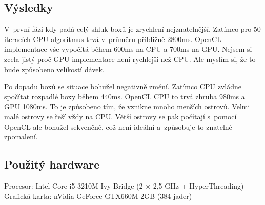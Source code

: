 \documentclass[11pt,a4paper]{article}
\begin{document}
\subsection{Výsledky}

V~první fázi kdy padá celý shluk boxů je zrychlení nejznatelnější.
Zatímco pro 50 iteracích CPU algoritmus trvá v~průměru přibližně 2800ms.
OpenCL implementace vše vypočítá během 600ms na CPU a 700ms na GPU.
Nejsem si zcela jistý proč GPU implementace není rychlejší než CPU. Ale myslím
si, že to bude způsobeno velikostí dávek.

Po dopadu boxů se situace bohužel negativně změní. Zatímco CPU zvládne spočítat
rozpadlé boxy během 440ms. OpenCL CPU to trvá zhruba 980ms a GPU 1080ms.
To je způsobeno tím, že vznikne mnoho menších ostrovů. Velmi malé ostrovy
se řeší vždy na CPU. Větší ostrovy se pak počítají s~pomocí OpenCL ale bohužel
sekvenčně, což není ideální a~způsobuje to znatelné zpomalení.

\subsection{Použitý hardware}


Procesor: Intel Core i5 3210M Ivy Bridge (2 $\times$ 2,5 GHz + HyperThreading) \\
Grafická karta: nVidia GeForce GTX660M 2GB (384 jader)
\end{document}
